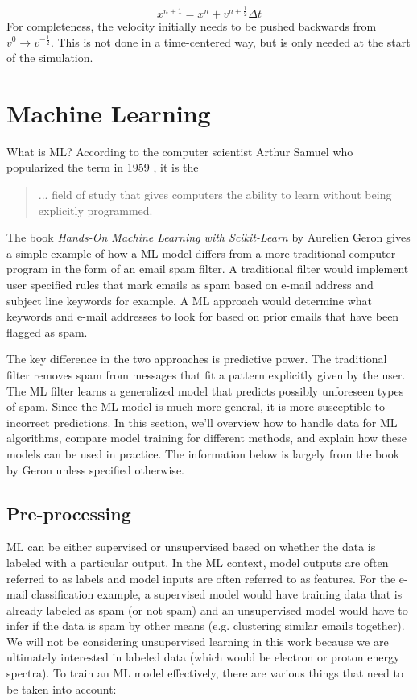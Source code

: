 \begin{equation}
	x^{n+1} = x^{n} + v^{n+\frac{1}{2}} \Delta t \label{eq:particlepush}
\end{equation}
For completeness, the velocity initially needs to be pushed backwards from $v^{0} \rightarrow v^{-\frac{1}{2}}$. This is not done in a time-centered way, but is only needed at the start of the simulation. 

\section{Machine Learning}
What is \gls{ML}? According to the computer scientist Arthur Samuel who popularized the term in 1959 \cite{Geron_2023_ML}, it is the 

\begin{quote}
	... field of study that gives computers the ability to learn without being explicitly programmed. 
\end{quote}
The book \emph{Hands-On Machine Learning with Scikit-Learn} by Aurelien Geron \cite{Geron_2023_ML} gives a simple example of how a \gls{ML} model differs from a more traditional computer program in the form of an email spam filter. A traditional filter would implement user specified rules that mark emails as spam based on e-mail address and subject line keywords for example. A \gls{ML} approach would determine what keywords and e-mail addresses to look for based on prior emails that have been flagged as spam.

The key difference in the two approaches is predictive power. The traditional filter removes spam from messages that fit a pattern explicitly given by the user. The \gls{ML} filter learns a generalized model that predicts possibly unforeseen types of spam. Since the \gls{ML} model is much more general, it is more susceptible to incorrect predictions. In this section, we'll overview how to handle data for \gls{ML} algorithms, compare model training for different methods, and explain how these models can be used in practice. The information below is largely from the book by Geron \cite{Geron_2023_ML} unless specified otherwise.

\subsection{Pre-processing}
\gls{ML} can be either supervised or unsupervised based on whether the data is labeled with a particular output. In the \gls{ML} context, model outputs are often referred to as labels and model inputs are often referred to as features. For the e-mail classification example, a supervised model would have training data that is already labeled as spam (or not spam) and an unsupervised model would have to infer if the data is spam by other means (e.g. clustering similar emails together). We will not be considering unsupervised learning in this work because we are ultimately interested in labeled data (which would be electron or proton energy spectra). To train an \gls{ML} model effectively, there are various things that need to be taken into account: 


